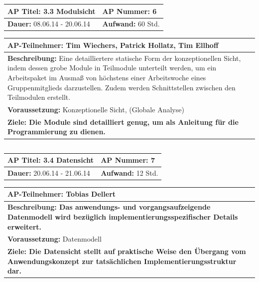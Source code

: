 \documentclass[fontsize=12pt,paper=a4,twoside]{scrartcl}
\begin{document}
\begin{tabular}{|p{7.43cm}|p{7.43cm}|}
\hline
\textbf{AP Titel: }3.3 Modulsicht & \textbf{AP Nummer: }6\\ 
\hline
\textbf{Dauer: }08.06.14 - 20.06.14& \textbf{Aufwand: }60 Std.\\
\hline
\end{tabular}
\begin{tabular}{|p{15.3cm}|}
\hline
\textbf{AP-Teilnehmer: }Tim Wiechers, Patrick Hollatz, Tim Ellhoff\\
\hline
\textbf{Beschreibung: }Eine detailliertere statische Form der konzeptionellen Sicht, indem dessen grobe Module in Teilmodule unterteilt werden, um ein Arbeitspaket im Ausmaß von höchstens einer Arbeitswoche eines Gruppenmitglieds darzustellen. Zudem werden Schnittstellen
zwischen den Teilmodulen erstellt. \\
\hline
\textbf{Voraussetzung: }Konzeptionelle Sicht, (Globale Analyse)\\
\hline 
\textbf{Ziele: Die Module sind detailliert genug, um als Anleitung für die Programmierung zu dienen.}\\
\hline 
\end{tabular}
\begin{verbatim}

\end{verbatim}

\begin{tabular}{|p{7.43cm}|p{7.43cm}|}
\hline
\textbf{AP Titel: }3.4 Datensicht & \textbf{AP Nummer: }7\\ 
\hline
\textbf{Dauer: }20.06.14 - 21.06.14& \textbf{Aufwand: }12 Std.\\
\hline
\end{tabular}
\begin{tabular}{|p{15.3cm}|}
\hline
\textbf{AP-Teilnehmer: }Tobias Dellert\\
\hline
\textbf{Beschreibung: Das anwendungs- und vorgangsaufzeigende Datenmodell wird bezüglich implementierungsspezifischer Details erweitert. }\\
\hline
\textbf{Voraussetzung: }Datenmodell\\
\hline 
\textbf{Ziele: Die Datensicht stellt auf praktische Weise den Übergang vom Anwendungskonzept zur tatsächlichen Implementierungsstruktur dar.}\\
\hline 
\end{tabular}
\begin{verbatim}

\end{verbatim}
\end{document}
